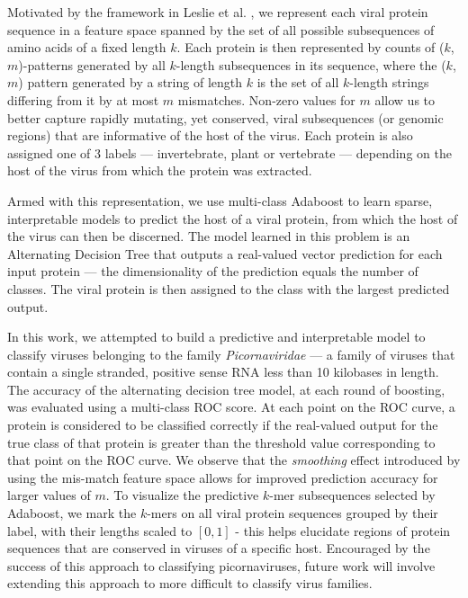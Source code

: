 

Motivated by the framework in Leslie et al. \cite{leslie}, we represent each viral protein
sequence in a feature space spanned by the set of all possible subsequences of amino acids
of a fixed length $k$. Each protein is then represented by counts of ($k$,$m$)-patterns
generated by all $k$-length subsequences in its sequence, where the ($k$,$m$) pattern 
generated by a string of length $k$ is the set of all $k$-length strings differing 
from it by at most $m$ mismatches. Non-zero values for $m$ allow us to better capture 
rapidly mutating, yet conserved, viral subsequences (or genomic regions) that are informative 
of the host of the virus. Each protein is also assigned one of 3 labels --- invertebrate, plant
or vertebrate --- depending on the host of the virus from which the protein was extracted.

Armed with this representation, we use multi-class Adaboost to learn sparse, interpretable
models to predict the host of a viral protein, from which the host of the virus can then
be discerned. The model learned in this problem is an Alternating Decision Tree that
outputs a real-valued vector prediction for each input protein --- the dimensionality 
of the prediction equals the number of classes. The viral protein is then assigned to the
class with the largest predicted output.

In this work, we attempted to build a predictive and interpretable model to classify viruses 
belonging to the family \textit{Picornaviridae} --- a family of viruses that contain a single 
stranded, positive sense RNA less than 10 kilobases in length. The accuracy of the alternating 
decision tree model, at each round of boosting, was evaluated using a multi-class ROC score.
At each point on the ROC curve, a protein is considered to be classified correctly if the 
real-valued output for the true class of that protein is greater than the threshold value
corresponding to that point on the ROC curve. We observe that the \textit{smoothing} effect introduced
by using the mis-match feature space allows for improved prediction accuracy for larger
values of $m$. To visualize the predictive $k$-mer subsequences selected by Adaboost, we 
mark the $k$-mers on all viral protein sequences grouped by their label, with their lengths 
scaled to $[0,1]$ - this helps elucidate regions of protein sequences that are conserved in 
viruses of a specific host. Encouraged by the success of this approach to classifying 
picornaviruses, future work will involve extending this approach to more difficult to classify
virus families.

